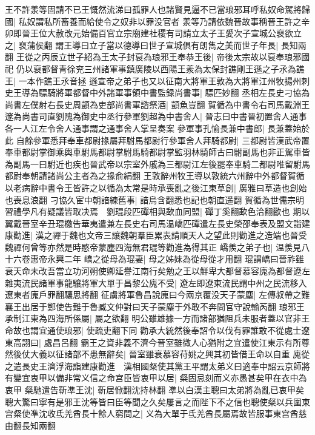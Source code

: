 王不許羕等固請不已王慨然流涕曰孤罪人也諸賢見逼不已當琅邪耳呼私奴命駕將歸國|{
	私奴謂私所畜養而給使令之奴非以罪没官者}
羕等乃請依魏晉故事稱晉王許之辛卯即晉王位大赦改元始備百官立宗廟建社稷有司請立太子王愛次子宣城公裒欲立之|{
	裒蒲侯翻}
謂王導曰立子當以德導曰世子宣城俱有朗雋之美而世子年長|{
	長知兩翻}
王從之丙辰立世子紹為王太子封裒為琅邪王奉恭王後|{
	帝後太宗故以裒奉琅邪國祀}
仍以裒都督青徐兖三州諸軍事鎮廣陵以西陽王羕為太保封譙剛王遜之子氶為譙王|{
	一本作譙王氶音拯}
遜宣帝之弟子也又以征南大將軍王敦為大將軍江州牧揚州刺史王導為驃騎將軍都督中外諸軍事領中書監録尚書事|{
	驃匹妙翻}
丞相左長史刁協為尚書左僕射右長史周顗為吏部尚書軍諮祭酒|{
	顗魚豈翻}
賀循為中書令右司馬戴淵王邃為尚書司直劉隗為御史中丞行參軍劉超為中書舍人|{
	晉志曰中書晉初置舍人通事各一人江左令舍人通事謂之通事舍人掌呈奏案}
參軍事孔愉長兼中書郎|{
	長兼蓋始於此}
自餘參軍悉拜奉車都尉掾屬拜駙馬都尉行參軍舍人拜騎都尉|{
	三都尉皆漢武帝置奉車都尉掌御乘輿車駙馬都尉掌駙馬騎都尉掌監羽林騎師古曰駙副馬也非正駕車皆為副馬一曰駙近也疾也晉武帝以宗室外戚為三都尉江左後罷奉車騎二都尉唯留駙馬都尉奉朝請諸尚公主者為之掾俞絹翻}
王敦辭州牧王導以敦統六州辭中外都督賀循以老病辭中書令王皆許之以循為太常是時承喪亂之後江東草創|{
	廣雅曰草造也創始也喪息浪翻}
刁協久宦中朝諳練舊事|{
	諳烏含翻悉也記也朝直遥翻}
賀循為世儒宗明習禮學凡有疑議皆取决焉　劉琨段匹磾相與歃血同盟|{
	磾丁奚翻歃色洽翻歠也}
期以翼戴晉室辛丑琨檄告華夷遣兼左長史右司馬温嶠匹磾遣左長史榮邵奉表及盟文詣建康勸進|{
	漢之禪于魏也文帝三讓魏朝羣臣累表請順天人之望此則勸進之造端也晉受魏禪何曾等亦然是時愍帝蒙塵四海無君琨等勸進為得其正}
嶠羨之弟子也|{
	温羨見八十六卷惠帝永興二年}
嶠之從母為琨妻|{
	母之姊妹為從母從才用翻}
琨謂嶠曰晉祚雖衰天命未改吾當立功河朔使卿延譽江南行矣勉之王以鮮卑大都督慕容廆為都督遼左雜夷流民諸軍事龍驤將軍大單于昌黎公廆不受|{
	遼左即遼東流民謂中州之民流移入遼東者廆戶罪翻驤思將翻}
征虜將軍魯昌說廆曰今兩京覆没天子蒙塵|{
	左傳叔帶之難襄王出居于鄭使告難于魯臧文仲對曰天子蒙塵于外敢不奔問官守說輸芮翻}
琅邪王承制江東為四海所係屬|{
	屬之欲翻}
明公雖雄據一方而諸部猶阻兵未服者蓋以官非王命故也謂宜通使琅邪|{
	使疏吏翻下同}
勸承大統然後奉詔令以伐有罪誰敢不從處士遼東高詡曰|{
	處昌呂翻}
霸王之資非義不濟今晉室雖微人心猶附之宜遣使江東示有所尊然後仗大義以征諸部不患無辭矣|{
	晉室雖衰慕容苻姚之興其初皆借王命以自重}
廆從之遣長史王濟浮海詣建康勸進　漢相國粲使其黨王平謂太弟义曰適奉中詔云京師將有變宜衷甲以備非常义信之命宫臣皆衷甲以居|{
	粲固忌刻而义亦愚甚矣甲在衣中為衷甲}
粲馳遣告靳凖王沈|{
	靳居惞翻沈持林翻}
凖以白漢主聰曰太弟將為亂已衷甲矣聰大驚曰寧有是邪王沈等皆曰臣等聞之久矣屢言之而陛下不之信也聰使粲以兵圍東宫粲使凖沈收氐羌酋長十餘人窮問之|{
	义為大單于氐羌酋長屬焉故皆服事東宫酋慈由翻長知兩翻}
